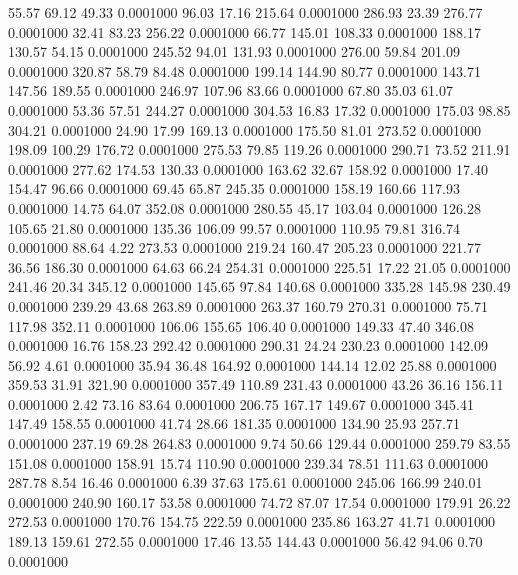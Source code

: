   55.57   69.12   49.33   0.0001000
  96.03   17.16  215.64   0.0001000
 286.93   23.39  276.77   0.0001000
  32.41   83.23  256.22   0.0001000
  66.77  145.01  108.33   0.0001000
 188.17  130.57   54.15   0.0001000
 245.52   94.01  131.93   0.0001000
 276.00   59.84  201.09   0.0001000
 320.87   58.79   84.48   0.0001000
 199.14  144.90   80.77   0.0001000
 143.71  147.56  189.55   0.0001000
 246.97  107.96   83.66   0.0001000
  67.80   35.03   61.07   0.0001000
  53.36   57.51  244.27   0.0001000
 304.53   16.83   17.32   0.0001000
 175.03   98.85  304.21   0.0001000
  24.90   17.99  169.13   0.0001000
 175.50   81.01  273.52   0.0001000
 198.09  100.29  176.72   0.0001000
 275.53   79.85  119.26   0.0001000
 290.71   73.52  211.91   0.0001000
 277.62  174.53  130.33   0.0001000
 163.62   32.67  158.92   0.0001000
  17.40  154.47   96.66   0.0001000
  69.45   65.87  245.35   0.0001000
 158.19  160.66  117.93   0.0001000
  14.75   64.07  352.08   0.0001000
 280.55   45.17  103.04   0.0001000
 126.28  105.65   21.80   0.0001000
 135.36  106.09   99.57   0.0001000
 110.95   79.81  316.74   0.0001000
  88.64    4.22  273.53   0.0001000
 219.24  160.47  205.23   0.0001000
 221.77   36.56  186.30   0.0001000
  64.63   66.24  254.31   0.0001000
 225.51   17.22   21.05   0.0001000
 241.46   20.34  345.12   0.0001000
 145.65   97.84  140.68   0.0001000
 335.28  145.98  230.49   0.0001000
 239.29   43.68  263.89   0.0001000
 263.37  160.79  270.31   0.0001000
  75.71  117.98  352.11   0.0001000
 106.06  155.65  106.40   0.0001000
 149.33   47.40  346.08   0.0001000
  16.76  158.23  292.42   0.0001000
 290.31   24.24  230.23   0.0001000
 142.09   56.92    4.61   0.0001000
  35.94   36.48  164.92   0.0001000
 144.14   12.02   25.88   0.0001000
 359.53   31.91  321.90   0.0001000
 357.49  110.89  231.43   0.0001000
  43.26   36.16  156.11   0.0001000
   2.42   73.16   83.64   0.0001000
 206.75  167.17  149.67   0.0001000
 345.41  147.49  158.55   0.0001000
  41.74   28.66  181.35   0.0001000
 134.90   25.93  257.71   0.0001000
 237.19   69.28  264.83   0.0001000
   9.74   50.66  129.44   0.0001000
 259.79   83.55  151.08   0.0001000
 158.91   15.74  110.90   0.0001000
 239.34   78.51  111.63   0.0001000
 287.78    8.54   16.46   0.0001000
   6.39   37.63  175.61   0.0001000
 245.06  166.99  240.01   0.0001000
 240.90  160.17   53.58   0.0001000
  74.72   87.07   17.54   0.0001000
 179.91   26.22  272.53   0.0001000
 170.76  154.75  222.59   0.0001000
 235.86  163.27   41.71   0.0001000
 189.13  159.61  272.55   0.0001000
  17.46   13.55  144.43   0.0001000
  56.42   94.06    0.70   0.0001000
